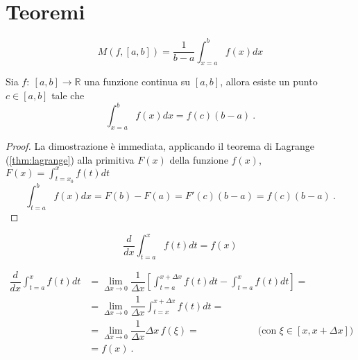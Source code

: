 \section{Teoremi}
\begin{definition}[Media]
    \begin{equation}
        M(f, [a,b]) = \dfrac{1}{b-a} \int_{x=a}^{b} f(x) dx
    \end{equation}
\end{definition}

\begin{theorem}
    Sia $f: \ [a,b] \rightarrow \mathbb{R}$ una funzione continua su $[a,b]$, allora esiste un punto $c \in [a,b]$ tale che
    \begin{equation}
        \int_{x=a}^{b} f(x) dx = f(c) (b-a) \ .
    \end{equation}
\end{theorem}
\begin{proof}
    La dimostrazione è immediata, applicando il teorema di Lagrange (\ref{thm:lagrange}) alla primitiva $F(x)$ della funzione $f(x)$, $F(x) = \int_{t=x_0}^{x} f(t) dt$ 
\begin{equation}
    \int_{t=a}^{b} f(x) dx = F(b) - F(a) = F'(c) (b-a) = f(c) (b-a) \ .
\end{equation}
\end{proof}


\begin{theorem}
    \begin{equation}
        \dfrac{d}{dx} \int_{t=a}^{x} f(t) dt = f(x)
    \end{equation}
\end{theorem}
\begin{equation}
    \begin{aligned}
        \dfrac{d}{dx} \int_{t=a}^{x} f(t) dt & = 
        \lim_{\Delta x \rightarrow 0} \dfrac{1}{\Delta x} \left[ \int_{t=a}^{x+\Delta x} f(t) dt - \int_{t=a}^{x} f(t) dt\right] = \\
        & = \lim_{\Delta x \rightarrow 0} \dfrac{1}{\Delta x} \int_{t=x}^{x+\Delta x} f(t) dt = \\
        & = \lim_{\Delta x \rightarrow 0} \dfrac{1}{\Delta x} \Delta x \, f(\xi) = \qquad \qquad \qquad \text{(con $\xi \in [x, x+\Delta x]$)} \\
        & = f(x)  \  .
    \end{aligned}
\end{equation}

